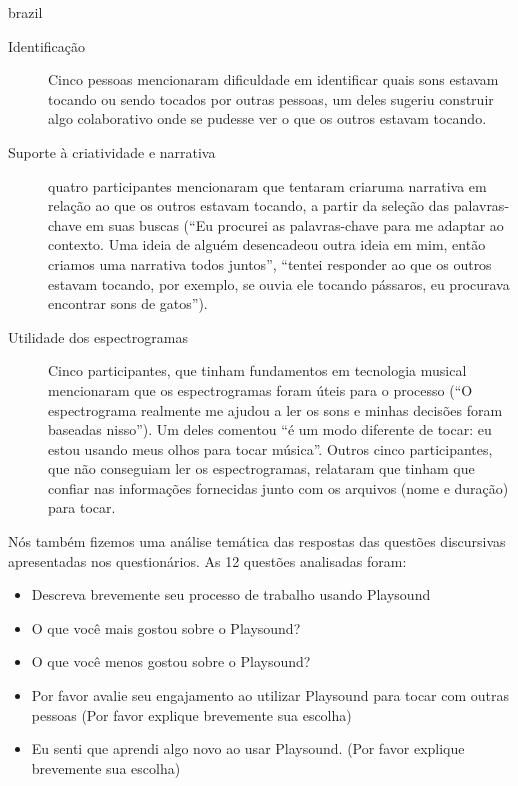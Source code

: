 \begin{otherlanguage*}{brazil}
\begin{description}
  \item[Identificação] Cinco pessoas mencionaram dificuldade em identificar quais sons estavam tocando ou sendo tocados por outras pessoas, um deles sugeriu construir algo colaborativo onde se pudesse ver o que os outros estavam tocando.

\item[Suporte à criatividade e narrativa] quatro participantes mencionaram que tentaram criaruma narrativa em relação ao que os outros estavam tocando, a partir da seleção das palavras-chave em suas buscas (``Eu procurei as palavras-chave para me adaptar ao contexto. Uma ideia de alguém desencadeou outra ideia em mim, então criamos uma narrativa todos juntos'', ``tentei responder ao que os outros estavam tocando, por exemplo, se ouvia ele tocando pássaros, eu procurava encontrar sons de gatos'').

\item[Utilidade dos espectrogramas] Cinco participantes, que tinham fundamentos em tecnologia musical mencionaram que os espectrogramas foram úteis para o processo (``O espectrograma realmente me ajudou a ler os sons e minhas decisões foram baseadas nisso''). Um deles comentou ``é um modo diferente de tocar: eu estou usando meus olhos para tocar música''. Outros cinco participantes, que não conseguiam ler os espectrogramas, relataram que tinham que confiar nas informações fornecidas junto com os arquivos (nome e duração) para tocar.

\end{description}

Nós também fizemos uma análise temática das respostas das questões discursivas apresentadas nos questionários. As 12 questões analisadas foram: 

\begin{itemize}

\item Descreva brevemente seu processo de trabalho usando Playsound

\item O que você mais gostou sobre o Playsound?

\item O que você menos gostou sobre o Playsound?

\item Por favor avalie seu engajamento ao utilizar Playsound para tocar com outras pessoas (Por favor explique brevemente sua escolha)

\item Eu senti que aprendi algo novo ao usar Playsound. (Por favor explique brevemente sua escolha)


\end{itemize}
\end{otherlanguage*}
